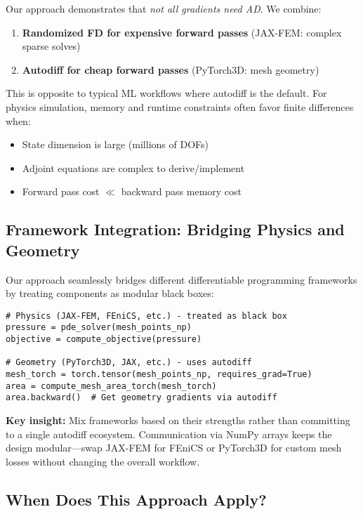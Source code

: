 \documentclass{article}
\begin{document}
Our approach demonstrates that \emph{not all gradients need AD}. We combine:
\begin{enumerate}
    \item \textbf{Randomized FD for expensive forward passes} (JAX-FEM: complex sparse solves)
    \item \textbf{Autodiff for cheap forward passes} (PyTorch3D: mesh geometry)
\end{enumerate}

This is opposite to typical ML workflows where autodiff is the default. For physics simulation, memory and runtime constraints often favor finite differences when:
\begin{itemize}
    \item State dimension is large (millions of DOFs)
    \item Adjoint equations are complex to derive/implement
    \item Forward pass cost $\ll$ backward pass memory cost
\end{itemize}

\subsection{Framework Integration: Bridging Physics and Geometry}

Our approach seamlessly bridges different differentiable programming frameworks by treating components as modular black boxes:

\begin{verbatim}
# Physics (JAX-FEM, FEniCS, etc.) - treated as black box
pressure = pde_solver(mesh_points_np)
objective = compute_objective(pressure)

# Geometry (PyTorch3D, JAX, etc.) - uses autodiff
mesh_torch = torch.tensor(mesh_points_np, requires_grad=True)
area = compute_mesh_area_torch(mesh_torch)
area.backward()  # Get geometry gradients via autodiff
\end{verbatim}

\textbf{Key insight:} Mix frameworks based on their strengths rather than committing to a single autodiff ecosystem. Communication via NumPy arrays keeps the design modular—swap JAX-FEM for FEniCS or PyTorch3D for custom mesh losses without changing the overall workflow.

\subsection{When Does This Approach Apply?}
\end{document}
